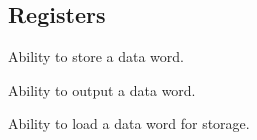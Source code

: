 \subsection{Registers}

\begin{turing-requirement}
  Ability to store a data word.
\end{turing-requirement}

\begin{turing-requirement}
  Ability to output a data word.
\end{turing-requirement}

\begin{turing-requirement}
  Ability to load a data word for storage.
\end{turing-requirement}